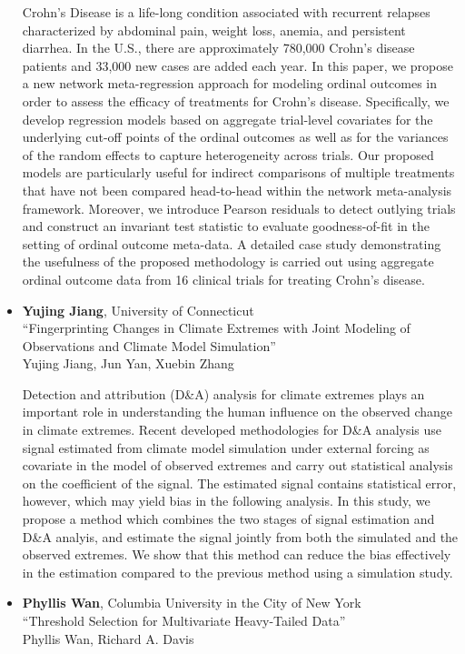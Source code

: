 \begin{itemize}
Crohn’s Disease is a life-long condition associated with recurrent relapses characterized by abdominal
pain, weight loss, anemia, and persistent diarrhea. In the U.S., there are approximately 780,000 Crohn’s disease
patients and 33,000 new cases are added each year. In this paper, we propose a new network meta-regression approach
for modeling ordinal outcomes in order to assess the eﬃcacy of treatments for Crohn’s disease. Speciﬁcally, we develop
regression models based on aggregate trial-level covariates for the underlying cut-oﬀ points of the ordinal outcomes
as well as for the variances of the random eﬀects to capture heterogeneity across trials. Our proposed models are
particularly useful for indirect comparisons of multiple treatments that have not been compared head-to-head within
the network meta-analysis framework. Moreover, we introduce Pearson residuals to detect outlying trials and construct
an invariant test statistic to evaluate goodness-of-ﬁt in the setting of ordinal outcome meta-data. A detailed case
study demonstrating the usefulness of the proposed methodology is carried out using aggregate ordinal outcome data
from 16 clinical trials for treating Crohn’s disease. 

\item \textbf{Yujing Jiang}, University of Connecticut \\
``Fingerprinting Changes in Climate Extremes with   Joint Modeling of Observations and Climate Model Simulation'' \\
Yujing Jiang, Jun Yan, Xuebin Zhang


 Detection and attribution (D\&A) analysis for climate extremes plays an
  important role in understanding the human influence on the observed change
  in climate extremes. Recent developed methodologies for D\&A analysis use
  signal estimated from climate model simulation under external forcing as
  covariate in the model of observed extremes and carry out statistical
  analysis on the coefficient of the signal. The estimated signal contains
  statistical error, however, which may yield bias in the following
  analysis. In this study, we propose a method which combines the two stages
  of signal estimation and D\&A analyis, and estimate the signal jointly
  from both the simulated and the observed extremes. We show that this
  method can reduce the bias effectively in the estimation compared to the
  previous method using a simulation study. 

\item \textbf{Phyllis Wan}, Columbia University in the City of New York \\
``Threshold Selection for Multivariate Heavy-Tailed Data'' \\
Phyllis Wan, Richard A. Davis



\end{itemize}
